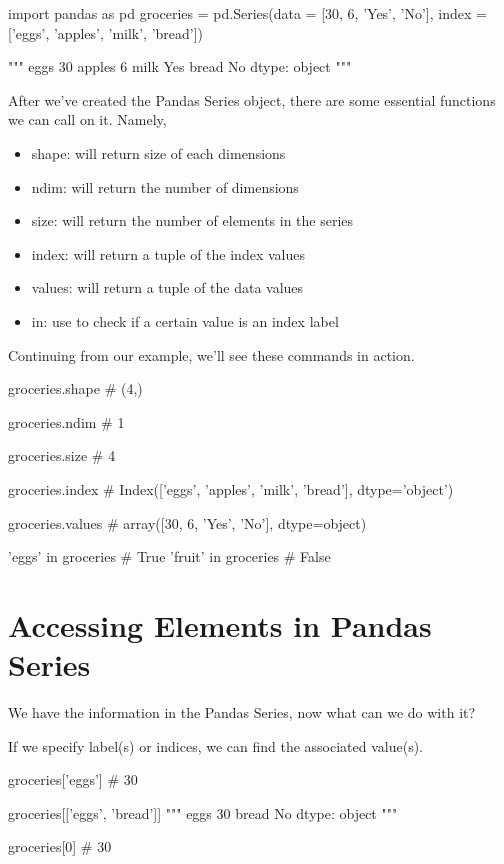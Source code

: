\documentclass{article}
\begin{document}
\begin{python}
	import pandas as pd
	groceries = pd.Series(data = [30, 6, 'Yes', 'No'],
	index = ['eggs', 'apples', 'milk', 'bread'])
	
	"""
	eggs       30
	apples      6
	milk      Yes
	bread      No
	dtype: object
	"""
\end{python}

After we've created the Pandas Series object, there are some essential functions we can call on it. Namely,
\begin{itemize}
	\item shape: will return size of each dimensions
	\item ndim: will return the number of dimensions
	\item size: will return the number of elements in the series
	\item index: will return a tuple of the index values
	\item values: will return a tuple of the data values
	\item in: use to check if a certain value is an index label
\end{itemize}

Continuing from our example, we'll see these commands in action.

\begin{python}
	groceries.shape
	# (4,)
	
	groceries.ndim
	# 1
	
	groceries.size
	# 4
	
	groceries.index 
	# Index(['eggs', 'apples', 'milk', 'bread'], dtype='object')
	
	groceries.values
	# array([30, 6, 'Yes', 'No'], dtype=object)
	
	'eggs' in groceries
	# True
	'fruit' in groceries
	# False
\end{python}


\section{Accessing Elements in Pandas Series}\label{sec:concept2}
We have the information in the Pandas Series, now what can we do with it?

If we specify label(s) or indices, we can find the associated value(s).
\begin{python}
	groceries['eggs']
	# 30
	
	groceries[['eggs', 'bread']]
	"""
	eggs     30
	bread    No
	dtype: object
	"""
	
	groceries[0]
	# 30
\end{python}
\end{document}

